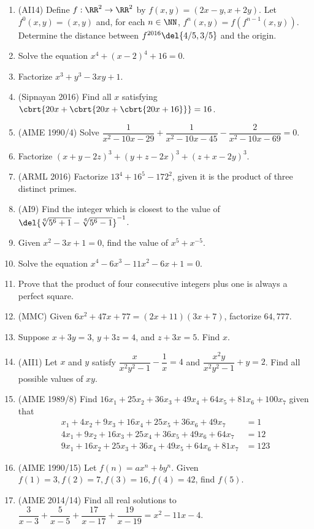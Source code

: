\documentclass[10pt,paper=letter]{scrartcl}
\begin{document}
\begin{enumerate}
  \item (AI14) Define $f: \RR^2 \rightarrow \RR^2$ by $f(x, y) = (2x - y, x + 2y)$. Let $f^0(x, y) = (x, y)$ and, for each $n \in \NN$, $f^n(x, y) = f(f^{n-1}(x, y))$. Determine the distance between $f^{2016}\del{4/5, 3/5}$ and the origin.
  \item Solve the equation $x^4 + (x-2)^4 + 16 = 0$.
  \item Factorize $x^3 + y^3 - 3xy + 1$.
  \item (Sipnayan 2016) Find all $x$ satisfying $\cbrt{20x + \cbrt{20x + \cbrt{20x + 16}}} = 16$.
  \item (AIME 1990/4) Solve $\dfrac1{x^2-10x-29} + \dfrac1{x^2-10x-45} - \dfrac2{x^2-10x-69} = 0$.
  \item Factorize $(x + y - 2z)^3 + (y + z - 2x)^3 + (z + x - 2y)^3$.
  \item (ARML 2016) Factorize $13^4 + 16^5 - 172^2$, given it is the product of three distinct primes.
  \item (AI9) Find the integer which is closest to the value of $\del{\sqrt[6]{5^6 + 1} - \sqrt[6]{5^6 - 1}}^{-1}$.
  \item Given $x^2 - 3x + 1 = 0$, find the value of $x^5 + x^{-5}$.
  \item Solve the equation $x^4 - 6x^3 - 11x^2 - 6x + 1 = 0$.
  \item Prove that the product of four consecutive integers plus one is always a perfect square.
  \item (MMC) Given $6x^2 + 47x + 77 = (2x + 11)(3x + 7)$, factorize $64{,}777$.
  \item Suppose $x + 3y = 3$, $y + 3z = 4$, and $z + 3x = 5$. Find $x$.
  \item (AII1) Let $x$ and $y$ satisfy $\dfrac{x}{x^2y^2 - 1} - \dfrac1{x} = 4$ and $\dfrac{x^2y}{x^2y^2 - 1} + y = 2$. Find all possible values of $xy$.
  \item (AIME 1989/8) Find $16x_1+25x_2+36x_3+49x_4+64x_5+81x_6+100x_7$ given that \begin{align*}x_1+4x_2+9x_3+16x_4+25x_5+36x_6+49x_7&=1\\ 4x_1+9x_2+16x_3+25x_4+36x_5+49x_6+64x_7&=12\\ 9x_1+16x_2+25x_3+36x_4+49x_5+64x_6+81x_7&=123\end{align*}
  \item (AIME 1990/15) Let $f(n) = ax^n + by^n$. Given $f(1) = 3, f(2) = 7, f(3) = 16, f(4) = 42$, find $f(5)$.
  \item (AIME 2014/14) Find all real solutions to $\dfrac3{x-3} + \dfrac5{x-5} + \dfrac{17}{x-17} + \dfrac{19}{x-19} = x^2 - 11x - 4$.
\end{enumerate}
\end{document}
